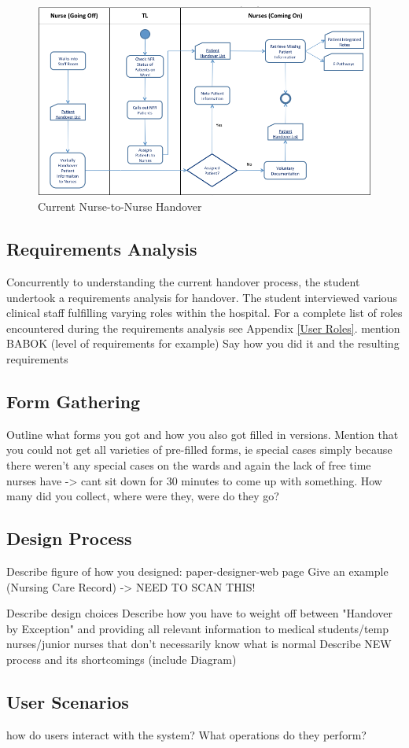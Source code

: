 \begin{figure}[hp]
				\centering
				\includegraphics[angle=-90,scale=1.0, width=120mm]{Images/Nurse-to-Nurse-Handover-Process-As-Is}
				\caption{Current Nurse-to-Nurse Handover}
\end{figure} 
\newpage

\subsection{Requirements Analysis}
Concurrently to understanding the current handover process, the student undertook a requirements analysis for handover. The student interviewed various clinical staff fulfilling varying roles within the hospital. For a complete list of roles encountered during the requirements analysis see Appendix \ref{User Roles}.
mention BABOK (level of requirements for example)
Say how you did it and the resulting requirements

\subsection{Form Gathering}
Outline what forms you got and how you also got filled in versions. Mention that you could not get all varieties of pre-filled forms, ie special cases simply because there weren't any special cases on the wards and again the lack of free time nurses have -> cant sit down for 30 minutes to come up with something. 
How many did you collect, where were they, were do they go?

\subsection{Design Process}
Describe figure of how you designed: paper-designer-web page
Give an example (Nursing Care Record) -> NEED TO SCAN THIS!

Describe design choices
Describe how you have to weight off between "Handover by Exception" and providing all relevant information to medical students/temp nurses/junior nurses that don't necessarily know what is normal
Describe NEW process and its shortcomings (include Diagram)

\subsection{User Scenarios}
how do users interact with the system? What operations do they perform?

